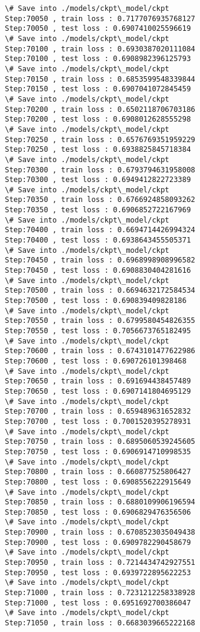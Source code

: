 \documentclass[11pt]{article}
\begin{document}
\begin{Verbatim}[commandchars=\\\{\}]
\# Save into ./models/ckpt\_model/ckpt
Step:70050 , train loss : 0.7177076935768127
Step:70050 , test loss : 0.6907410025596619
\# Save into ./models/ckpt\_model/ckpt
Step:70100 , train loss : 0.6930387020111084
Step:70100 , test loss : 0.6908982396125793
\# Save into ./models/ckpt\_model/ckpt
Step:70150 , train loss : 0.6853599548339844
Step:70150 , test loss : 0.6907041072845459
\# Save into ./models/ckpt\_model/ckpt
Step:70200 , train loss : 0.6502118706703186
Step:70200 , test loss : 0.6908012628555298
\# Save into ./models/ckpt\_model/ckpt
Step:70250 , train loss : 0.6576769351959229
Step:70250 , test loss : 0.6938825845718384
\# Save into ./models/ckpt\_model/ckpt
Step:70300 , train loss : 0.6793794631958008
Step:70300 , test loss : 0.6949412822723389
\# Save into ./models/ckpt\_model/ckpt
Step:70350 , train loss : 0.6766924858093262
Step:70350 , test loss : 0.6906852722167969
\# Save into ./models/ckpt\_model/ckpt
Step:70400 , train loss : 0.6694714426994324
Step:70400 , test loss : 0.6938643455505371
\# Save into ./models/ckpt\_model/ckpt
Step:70450 , train loss : 0.6968998908996582
Step:70450 , test loss : 0.6908830404281616
\# Save into ./models/ckpt\_model/ckpt
Step:70500 , train loss : 0.6694632172584534
Step:70500 , test loss : 0.690839409828186
\# Save into ./models/ckpt\_model/ckpt
Step:70550 , train loss : 0.6799580454826355
Step:70550 , test loss : 0.7056673765182495
\# Save into ./models/ckpt\_model/ckpt
Step:70600 , train loss : 0.6743101477622986
Step:70600 , test loss : 0.690726101398468
\# Save into ./models/ckpt\_model/ckpt
Step:70650 , train loss : 0.691694438457489
Step:70650 , test loss : 0.6907141804695129
\# Save into ./models/ckpt\_model/ckpt
Step:70700 , train loss : 0.659489631652832
Step:70700 , test loss : 0.7001520395278931
\# Save into ./models/ckpt\_model/ckpt
Step:70750 , train loss : 0.6895060539245605
Step:70750 , test loss : 0.6906914710998535
\# Save into ./models/ckpt\_model/ckpt
Step:70800 , train loss : 0.660877525806427
Step:70800 , test loss : 0.6908556222915649
\# Save into ./models/ckpt\_model/ckpt
Step:70850 , train loss : 0.6880109906196594
Step:70850 , test loss : 0.6906829476356506
\# Save into ./models/ckpt\_model/ckpt
Step:70900 , train loss : 0.6708523035049438
Step:70900 , test loss : 0.6909782290458679
\# Save into ./models/ckpt\_model/ckpt
Step:70950 , train loss : 0.7214434742927551
Step:70950 , test loss : 0.6939722895622253
\# Save into ./models/ckpt\_model/ckpt
Step:71000 , train loss : 0.7231212258338928
Step:71000 , test loss : 0.6951692700386047
\# Save into ./models/ckpt\_model/ckpt
Step:71050 , train loss : 0.6683039665222168

\end{Verbatim}
\end{document}
